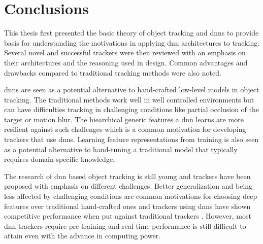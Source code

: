 \section{Conclusions}

This thesis first presented the basic theory of object tracking and \ac{dnn}s to provide basis for understanding the motivations in applying \ac{dnn} architectures to tracking. Several novel and successful trackers were then reviewed with an emphasis on their architectures and the reasoning used in design. Common advantages and drawbacks compared to traditional tracking methods were also noted.

\ac{dnn}s are seen as a potential alternative to hand-crafted low-level models in object tracking. The traditional methods work well in well controlled environments but can have difficulties tracking in challenging conditions like partial occlusion of the target or motion blur. The hiearchical generic features a \ac{dnn} learns are more resilient against such challenges which is a common motivation for developing trackers that use \ac{dnn}s. Learning feature representations from training is also seen as a potential alternative to hand-tuning a traditional model that typically requires domain specific knowledge.~\cite{DLT}

The research of \ac{dnn} based object tracking is still young and trackers have been proposed with emphasis on different challenges. Better generalization and being less affected by challenging conditions are common motivations for choosing deep features over traditional hand-crafted ones and trackers using \ac{dnn}s have shown competitive performance when put against traditional trackers \cite{DEEPTRACK}. However, most \ac{dnn} trackers require pre-training and real-time performance is still difficult to attain even with the advance in computing power.
